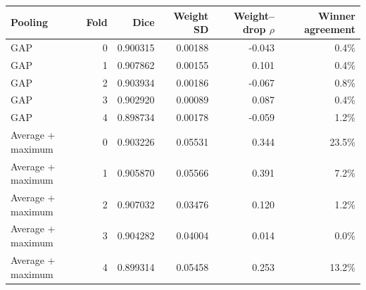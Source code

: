 \begin{tabular}{lrrrrr}
\toprule
Pooling & Fold & Dice & Weight SD & Weight--drop $\rho$ & Winner agreement \\
\midrule
GAP & 0 & 0.900315 & 0.00188 & -0.043 & 0.4\% \\
GAP & 1 & 0.907862 & 0.00155 & 0.101 & 0.4\% \\
GAP & 2 & 0.903934 & 0.00186 & -0.067 & 0.8\% \\
GAP & 3 & 0.902920 & 0.00089 & 0.087 & 0.4\% \\
GAP & 4 & 0.898734 & 0.00178 & -0.059 & 1.2\% \\
Average + maximum & 0 & 0.903226 & 0.05531 & 0.344 & 23.5\% \\
Average + maximum & 1 & 0.905870 & 0.05566 & 0.391 & 7.2\% \\
Average + maximum & 2 & 0.907032 & 0.03476 & 0.120 & 1.2\% \\
Average + maximum & 3 & 0.904282 & 0.04004 & 0.014 & 0.0\% \\
Average + maximum & 4 & 0.899314 & 0.05458 & 0.253 & 13.2\% \\
\bottomrule
\end{tabular}
